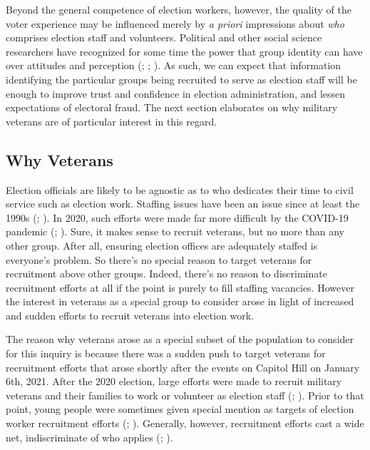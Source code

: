\documentclass[
  12pt,
  letterpaper,
]{article}
\begin{document}
Beyond the general competence of election workers, however, the quality
of the voter experience may be influenced merely by \emph{a priori}
impressions about \emph{who} comprises election staff and volunteers.
Political and other social science researchers have recognized for some
time the power that group identity can have over attitudes and
perception (;
;
). As such, we can
expect that information identifying the particular groups being
recruited to serve as election staff will be enough to improve trust and
confidence in election administration, and lessen expectations of
electoral fraud. The next section elaborates on why military veterans
are of particular interest in this regard.

\subsection{Why Veterans}\label{why-veterans}

Election officials are likely to be agnostic as to who dedicates their
time to civil service such as election work. Staffing issues have been
an issue since at least the 1990s (; ). In 2020, such efforts were made far more difficult by the
COVID-19 pandemic (;
). Sure, it makes sense to recruit
veterans, but no more than any other group. After all, ensuring election
offices are adequately staffed is everyone's problem. So there's no
special reason to target veterans for recruitment above other groups.
Indeed, there's no reason to discriminate recruitment efforts at all if
the point is purely to fill staffing vacancies. However the interest in
veterans as a special group to consider arose in light of increased and
sudden efforts to recruit veterans into election work.

The reason why veterans arose as a special subset of the population to
consider for this inquiry is because there was a sudden push to target
veterans for recruitment efforts that arose shortly after the events on
Capitol Hill on January 6th, 2021. After the 2020 election, large
efforts were made to recruit military veterans and their families to
work or volunteer as election staff
(;
). Prior to that
point, young people were sometimes given special mention as targets of
election worker recruitment efforts (; ).
Generally, however, recruitment efforts cast a wide net, indiscriminate
of who applies (;
).
\end{document}
